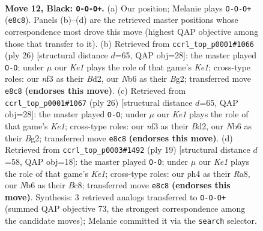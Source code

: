 \documentclass[11pt]{article}
\begin{document}
\clearpage

\begin{figure}[p]\centering
\begin{subfigure}{0.46\textwidth}\centering
\resizebox{\linewidth}{!}{%
\newchessgame
\chessboard[
  setfen={r3k1r1/ppp1ppbp/1nn3p1/4P3/6bP/NB3N2/PPP2PP1/R1BK2R1 b q - 0 12},
  showmover=false,
  pgfstyle=straightmove, color=movearrow, markmove={e8-c8}
]}
\caption{}
\end{subfigure}\hfill
\begin{subfigure}{0.46\textwidth}\centering
\resizebox{\linewidth}{!}{%
\newchessgame
\chessboard[
  setfen={r1b4r/1p2kppp/2n2n2/p3p3/Nb6/1N4P1/PP1BPPBP/R3K2R w KQ - 6 14},
  showmover=false,
  pgfstyle=straightmove, color=movearrow, markmove={e1-g1}
]}
\caption{}
\end{subfigure}
\\[4pt]
\begin{subfigure}{0.46\textwidth}\centering
\resizebox{\linewidth}{!}{%
\newchessgame
\chessboard[
  setfen={r1b4r/1p2kppp/2n2n2/p3p3/Nb6/1N4P1/PP1BPPBP/R3K2R w KQ - 4 14},
  showmover=false,
  pgfstyle=straightmove, color=movearrow, markmove={e1-g1}
]}
\caption{}
\end{subfigure}\hfill
\begin{subfigure}{0.46\textwidth}\centering
\resizebox{\linewidth}{!}{%
\newchessgame
\chessboard[
  setfen={r1b1k2r/ppp1bpp1/1nn4p/4P3/4P2P/P3BN2/1P3PP1/RN2KB1R b KQkq - 2 10},
  showmover=false,
  pgfstyle=straightmove, color=movearrow, markmove={e8-g8}
]}
\caption{}
\end{subfigure}
\caption{\textbf{Move 12, Black: \texttt{O-O-O+}.} (a) Our position; Melanie plays \texttt{O-O-O+} (\texttt{e8c8}). Panels (b)--(d) are the retrieved master positions whose correspondence most drove this move (highest QAP objective among those that transfer to it). (b) Retrieved from \texttt{ccrl\_top\_p0001\#1066} (ply 26) [structural distance $d$=65, QAP obj=28]: the master played \texttt{O-O}; under $\mu$ our \emph{Ke1} plays the role of that game's \emph{Ke1}; cross-type roles: our \emph{n}f3 as their \emph{B}d2, our \emph{N}b6 as their \emph{B}g2; transferred move \texttt{e8c8} \textbf{(endorses this move)}. (c) Retrieved from \texttt{ccrl\_top\_p0001\#1067} (ply 26) [structural distance $d$=65, QAP obj=28]: the master played \texttt{O-O}; under $\mu$ our \emph{Ke1} plays the role of that game's \emph{Ke1}; cross-type roles: our \emph{n}f3 as their \emph{B}d2, our \emph{N}b6 as their \emph{B}g2; transferred move \texttt{e8c8} \textbf{(endorses this move)}. (d) Retrieved from \texttt{ccrl\_top\_p0003\#1492} (ply 19) [structural distance $d$=58, QAP obj=18]: the master played \texttt{O-O}; under $\mu$ our \emph{Ke1} plays the role of that game's \emph{Ke1}; cross-type roles: our \emph{p}h4 as their \emph{R}a8, our \emph{N}b6 as their \emph{B}c8; transferred move \texttt{e8c8} \textbf{(endorses this move)}. Synthesis: 3 retrieved analogs transferred to \texttt{O-O-O+} (summed QAP objective 73, the strongest correspondence among the candidate moves); Melanie committed it via the \texttt{search} selector.}
\label{fig:thought-m23}
\end{figure}
\end{document}
